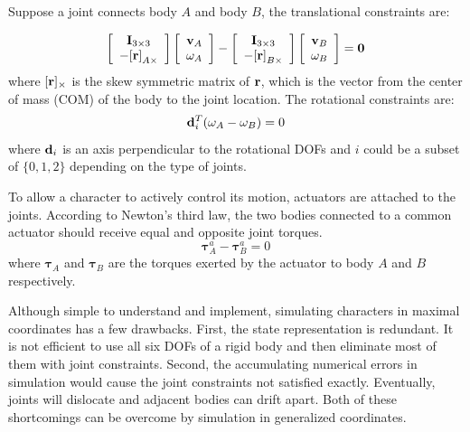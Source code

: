 Suppose a joint connects body $A$ and body $B$, the translational constraints are:

\begin{displaymath}
\left[\begin{array}{c}
\mathbf{I}_{3\times 3}\\
-\mathbf{[r]}_{A\times}
\end{array}\right]
\left[\begin{array}{c}
\mathbf{v}_A \\
\mathbf{\omega}_A
\end{array}\right]-
\left[\begin{array}{c}
\mathbf{I}_{3\times 3}\\
-\mathbf{[r]}_{B\times}
\end{array}\right]
\left[\begin{array}{c}
\mathbf{v}_B \\
\mathbf{\omega}_B
\end{array}\right]
=\mathbf{0}
\end{displaymath}
where $[\mathbf{r}]_\times$ is the skew symmetric matrix of $\mathbf{r}$, which is the vector from the center of mass (COM) of the body to the joint location. The rotational constraints are:
\begin{displaymath}
\mathbf{d}_i^T(\mathbf{\omega}_A-\mathbf{\omega}_B)=0
  \end{displaymath}
where $\mathbf{d}_i$ is an axis perpendicular to the rotational DOFs and $i$ could be a subset of $\{0,1,2\}$ depending on the type of joints. 

To allow a character to actively control its motion, actuators are attached to the joints. According to Newton's third law, the two bodies connected to a common actuator should receive equal and opposite joint torques.
\begin{displaymath}
\boldsymbol{\tau}^a_A-\boldsymbol{\tau}^a_B=0
\label{eq:actuatorConstraint}
\end{displaymath}
where $\boldsymbol{\tau}_A$ and $\boldsymbol{\tau}_B$ are the torques exerted by the actuator to body $A$ and $B$ respectively.

Although simple to understand and implement, simulating characters in maximal coordinates has a few drawbacks. First, the state representation is redundant. It is not efficient to use all six DOFs of a rigid body and then eliminate most of them with joint constraints. Second, the accumulating numerical errors in simulation would cause the joint constraints not satisfied exactly. Eventually, joints will dislocate and adjacent bodies can drift apart. Both of these shortcomings can be overcome by simulation in generalized coordinates.

